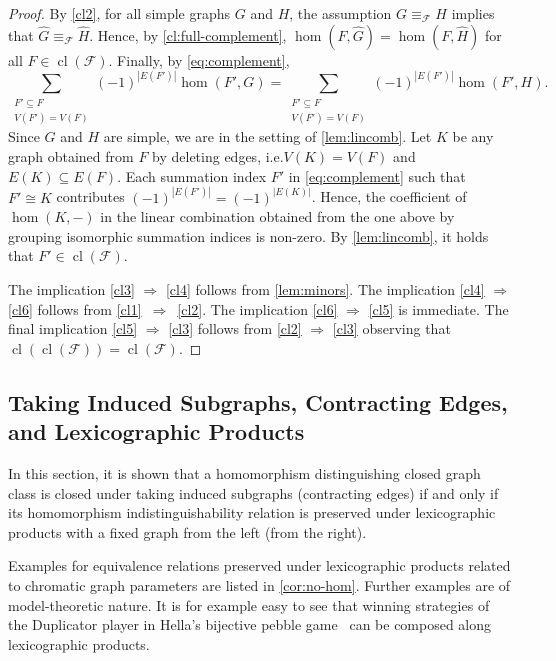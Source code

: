\documentclass[3p,final]{elsarticle}
\DeclareMathOperator{\cl}{cl}
\begin{document}
\begin{proof}
		By \ref{cl2}, for all simple graphs $G$ and $H$, the assumption $G \equiv_{\mathcal{F}} H $ implies that $\widehat{G} \equiv_{\mathcal{F}} \widehat{H}$.
		Hence, by \cref{cl:full-complement}, $\hom(F, \widehat{G}) = \hom(F, \widehat{H})$  for all $F \in \cl(\mathcal{F})$.
		Finally, by \cref{eq:complement},
		\[
			\sum_{\substack{F' \subseteq F \\ V(F') = V(F)}} (-1)^{|E(F')|} \hom(F', G)
			= \sum_{\substack{F' \subseteq F \\ V(F') = V(F)}} (-1)^{|E(F')|} \hom(F', H).
		\]
			Since $G$ and $H$ are simple, we are in the setting of \cref{lem:lincomb}.
		Let $K$ be any graph obtained from $F$ by deleting edges, i.e.\@ $V(K) = V(F)$ and $E(K) \subseteq E(F)$.
		Each summation index $F'$ in \cref{eq:complement}  such that $F' \cong K$ contributes $(-1)^{|E(F')|} = (-1)^{|E(K)|}$.
		Hence, the coefficient of $\hom(K, -)$ in the linear combination obtained from the one above by grouping isomorphic summation indices is non-zero.
		By \cref{lem:lincomb}, it holds that $F' \in \cl(\mathcal{F})$.
		
		The implication \ref{cl3} $\Rightarrow$ \ref{cl4} follows from \cref{lem:minors}.
		The implication \ref{cl4} $\Rightarrow$ \ref{cl6} follows from \ref{cl1}~$\Rightarrow$~\ref{cl2}.
		The implication \ref{cl6} $\Rightarrow$ \ref{cl5} is immediate.
		The final implication \ref{cl5} $\Rightarrow$ \ref{cl3} follows from \ref{cl2} $\Rightarrow$ \ref{cl3} observing that $\cl(\cl(\mathcal{F})) = \cl(\mathcal{F})$.
	\end{proof}

	\subsection{Taking Induced Subgraphs, Contracting Edges, and Lexicographic Products}
	
	In this section, it is shown that a homomorphism distinguishing closed graph class is closed under taking induced subgraphs (contracting edges) if and only if its homomorphism indistinguishability relation is preserved under lexicographic products with a fixed graph from the left (from the right).
	
	Examples for equivalence relations preserved under lexicographic products related to chromatic graph parameters are listed in \cref{cor:no-hom}. 
	Further examples are of model-theoretic nature.
	It is for example easy to see that winning strategies of the Duplicator player in Hella's bijective pebble game~\cite{hella_logical_1996} can be composed along lexicographic products.
	
\end{document}
